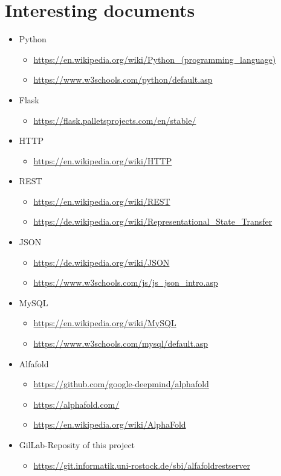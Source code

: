 \documentclass{article}
\begin{document}
\section{Interesting documents}
\begin{itemize}
\item Python
  \begin{itemize}
  \item \url{https://en.wikipedia.org/wiki/Python_(programming_language)}
  \item \url{https://www.w3schools.com/python/default.asp}
  \end{itemize}
\item Flask
  \begin{itemize}
  \item \url{https://flask.palletsprojects.com/en/stable/}
  \end{itemize}
\item HTTP
  \begin{itemize}
  \item \url{https://en.wikipedia.org/wiki/HTTP}
  \end{itemize}
\item REST
  \begin{itemize}
  \item \url{https://en.wikipedia.org/wiki/REST}
  \item \url{https://de.wikipedia.org/wiki/Representational_State_Transfer}
  \end{itemize}
\item JSON
  \begin{itemize}
  \item \url{https://de.wikipedia.org/wiki/JSON}
  \item \url{https://www.w3schools.com/js/js_json_intro.asp}
  \end{itemize}
\item MySQL
  \begin{itemize}
  \item \url{https://en.wikipedia.org/wiki/MySQL}
  \item \url{https://www.w3schools.com/mysql/default.asp}
  \end{itemize}
\item Alfafold
  \begin{itemize}
  \item \url{https://github.com/google-deepmind/alphafold}
  \item \url{https://alphafold.com/}
  \item \url{https://en.wikipedia.org/wiki/AlphaFold}
  \end{itemize}
\item GilLab-Reposity of this project
  \begin{itemize}
  \item \url{https://git.informatik.uni-rostock.de/sbi/alfafoldrestserver}
  \end{itemize}
\end{itemize}
\end{document}

